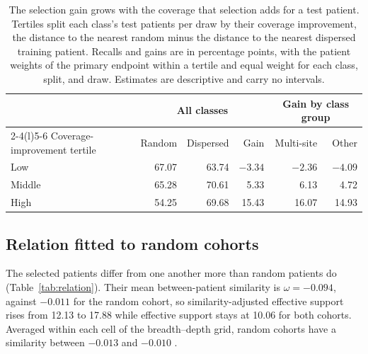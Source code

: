 \begin{table}[htbp]
\centering
\small
\renewcommand{\arraystretch}{1.15}
\begin{tabular}{@{}lrrrrr@{}}
\toprule
 & \multicolumn{3}{c}{All classes} & \multicolumn{2}{c}{Gain by class group} \\
\cmidrule(lr){2-4}\cmidrule(l){5-6}
Coverage-improvement tertile & Random & Dispersed & Gain & Multi-site & Other \\
\midrule
Low & 67.07 & 63.74 & $-3.34$ & $-2.36$ & $-4.09$ \\
Middle & 65.28 & 70.61 & 5.33 & 6.13 & 4.72 \\
High & 54.25 & 69.68 & 15.43 & 16.07 & 14.93 \\
\bottomrule
\end{tabular}
\caption{The selection gain grows with the coverage that selection adds for a test patient. Tertiles split each class's test patients per draw by their coverage improvement, the distance to the nearest random minus the distance to the nearest dispersed training patient. Recalls and gains are in percentage points, with the patient weights of the primary endpoint within a tertile and equal weight for each class, split, and draw. Estimates are descriptive and carry no intervals.}
\label{tab:tertiles}
\end{table}

\subsection{Relation fitted to random cohorts}
\label{sec:relation-results}
The selected patients differ from one another more than random patients do (Table~\ref{tab:relation}). Their mean between-patient similarity is $\omega=-0.094$, against $-0.011$ for the random cohort, so similarity-adjusted effective support rises from 12.13 to 17.88 while effective support stays at 10.06 for both cohorts. Averaged within each cell of the breadth--depth grid, random cohorts have a similarity between $-0.013$ and $-0.010$ \citep{queisler2026coverageRedundancy}.

